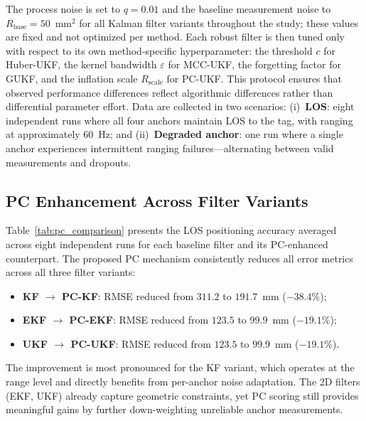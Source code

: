 \documentclass[journal]{IEEEtran}
\begin{document}
The process noise is set to $q = 0.01$ and the baseline measurement noise to $R_{\text{base}} = 50$~mm$^2$ for all Kalman filter variants throughout the study; these values are fixed and not optimized per method. Each robust filter is then tuned only with respect to its own method-specific hyperparameter: the threshold $c$ for Huber-UKF, the kernel bandwidth $\varepsilon$ for MCC-UKF, the forgetting factor for GUKF, and the inflation scale $R_{\text{scale}}$ for PC-UKF. This protocol ensures that observed performance differences reflect algorithmic differences rather than differential parameter effort. Data are collected in two scenarios: (i)~\textbf{LOS}: eight independent runs where all four anchors maintain LOS to the tag, with ranging at approximately 60~Hz; and (ii)~\textbf{Degraded anchor}: one run where a single anchor experiences intermittent ranging failures---alternating between valid measurements and dropouts.

\subsection{PC Enhancement Across Filter Variants}

Table~\ref{tab:pc_comparison} presents the LOS positioning accuracy averaged across eight independent runs for each baseline filter and its PC-enhanced counterpart. The proposed PC mechanism consistently reduces all error metrics across all three filter variants:
\begin{itemize}
    \item \textbf{KF $\to$ PC-KF}: RMSE reduced from $311.2$ to $191.7$~mm ($-38.4\%$);
    \item \textbf{EKF $\to$ PC-EKF}: RMSE reduced from $123.5$ to $99.9$~mm ($-19.1\%$);
    \item \textbf{UKF $\to$ PC-UKF}: RMSE reduced from $123.5$ to $99.9$~mm ($-19.1\%$).
\end{itemize}
The improvement is most pronounced for the KF variant, which operates at the range level and directly benefits from per-anchor noise adaptation. The 2D filters (EKF, UKF) already capture geometric constraints, yet PC scoring still provides meaningful gains by further down-weighting unreliable anchor measurements.
\end{document}
